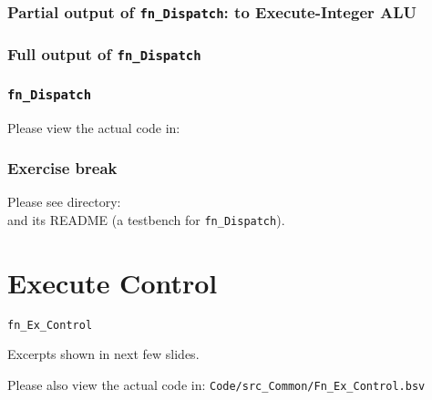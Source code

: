 \begin{frame}[fragile]
\frametitle{Partial output of {\tt fn\_Dispatch}: to Execute-Integer ALU}

\footnotesize


\end{frame}


\begin{frame}[fragile]
\frametitle{Full output of {\tt fn\_Dispatch}}

\footnotesize


\end{frame}


\begin{frame}
\frametitle{{\tt fn\_Dispatch}}

\footnotesize

\begin{center}\large
 Please view the actual code in: 
\end{center}

\end{frame}


\begin{frame}
\frametitle{\EmojiExercise \hmm Exercise break}

Please see directory:  \\
and its README (a testbench for {\tt fn\_Dispatch}).

\end{frame}


\section{Execute Control}

\begin{frame}[fragile]

\begin{center}
  {\LARGE\tt fn\_Ex\_Control}

  \vspace{5ex}

  Excerpts shown in next few slides.

  Please also view the actual code in:
  {\tt Code/src\_Common/Fn\_Ex\_Control.bsv}

\end{center}

\end{frame}

